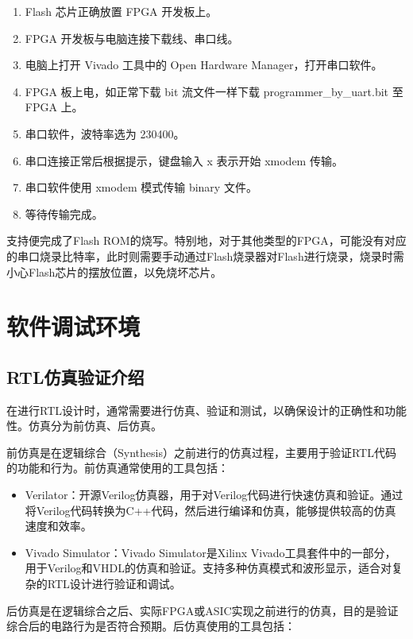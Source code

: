 \begin{enumerate}
\def\labelenumi{\arabic{enumi}.}
\item
  Flash 芯片正确放置 FPGA 开发板上。
\item
  FPGA 开发板与电脑连接下载线、串口线。
\item
  电脑上打开 Vivado 工具中的 Open Hardware Manager，打开串口软件。
\item
  FPGA 板上电，如正常下载 bit 流文件一样下载 programmer\_by\_uart.bit 至 FPGA 上。
\item
  串口软件，波特率选为 230400。
\item
  串口连接正常后根据提示，键盘输入 x 表示开始 xmodem 传输。
\item
  串口软件使用 xmodem 模式传输 binary 文件。
\item
  等待传输完成。
\end{enumerate}

支持便完成了Flash ROM的烧写。特别地，对于其他类型的FPGA，可能没有对应的串口烧录比特率，此时则需要手动通过Flash烧录器对Flash进行烧录，烧录时需小心Flash芯片的摆放位置，以免烧坏芯片。

\section{软件调试环境}\label{sec:02-design-environment-006}

\subsection{RTL仿真验证介绍}\label{sec:02-design-environment-007}

在进行RTL设计时，通常需要进行仿真、验证和测试，以确保设计的正确性和功能性。仿真分为前仿真、后仿真。

前仿真是在逻辑综合（Synthesis）之前进行的仿真过程，主要用于验证RTL代码的功能和行为。前仿真通常使用的工具包括：

\begin{itemize}
\item
  Verilator：开源Verilog仿真器，用于对Verilog代码进行快速仿真和验证。通过将Verilog代码转换为C++代码，然后进行编译和仿真，能够提供较高的仿真速度和效率。
\item
  Vivado Simulator：Vivado Simulator是Xilinx Vivado工具套件中的一部分，用于Verilog和VHDL的仿真和验证。支持多种仿真模式和波形显示，适合对复杂的RTL设计进行验证和调试。
\end{itemize}

后仿真是在逻辑综合之后、实际FPGA或ASIC实现之前进行的仿真，目的是验证综合后的电路行为是否符合预期。后仿真使用的工具包括：

